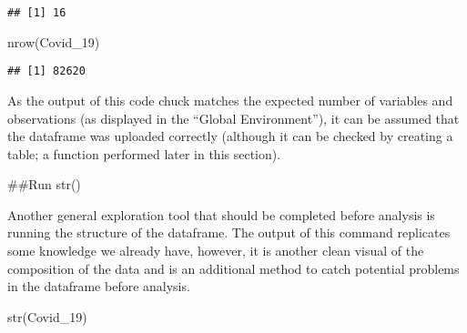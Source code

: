 \documentclass[
]{article}
\newenvironment{Shaded}{\begin{snugshade}}{\end{snugshade}}
\newcommand{\FunctionTok}[1]{\textcolor[rgb]{0.00,0.00,0.00}{#1}}
\newcommand{\NormalTok}[1]{#1}
\begin{document}
\begin{verbatim}
## [1] 16
\end{verbatim}

\begin{Shaded}
\begin{Highlighting}[]
\FunctionTok{nrow}\NormalTok{(Covid\_19)}
\end{Highlighting}
\end{Shaded}

\begin{verbatim}
## [1] 82620
\end{verbatim}

As the output of this code chuck matches the expected number of
variables and observations (as displayed in the ``Global Environment''),
it can be assumed that the dataframe was uploaded correctly (although it
can be checked by creating a table; a function performed later in this
section).

\#\#Run str()

Another general exploration tool that should be completed before
analysis is running the structure of the dataframe. The output of this
command replicates some knowledge we already have, however, it is
another clean visual of the composition of the data and is an additional
method to catch potential problems in the dataframe before analysis.

\begin{Shaded}
\begin{Highlighting}[]
\FunctionTok{str}\NormalTok{(Covid\_19)}
\end{Highlighting}
\end{Shaded}
\end{document}
